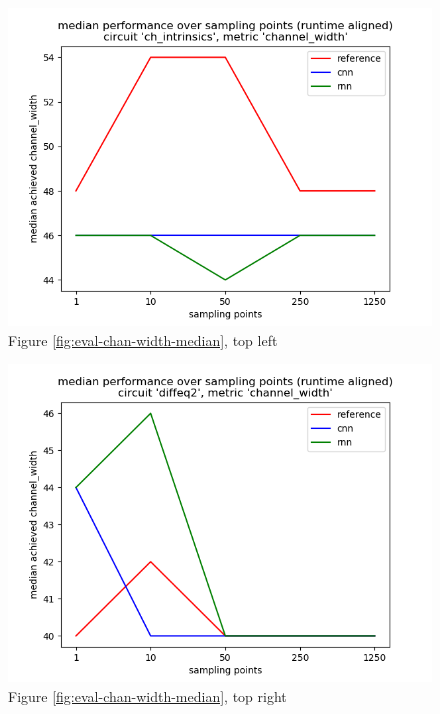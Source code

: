 \begin{figure}[H]
	\includegraphics[width=\linewidth]{plots/eval-ch_intrinsics-chan-width-median-full.png}
	\caption{Figure \ref{fig:eval-chan-width-median}, top left}
\end{figure}

\begin{figure}[H]
	\includegraphics[width=\linewidth]{plots/eval-diffeq2-chan-width-median-full.png}
	\caption{Figure \ref{fig:eval-chan-width-median}, top right}
\end{figure}

